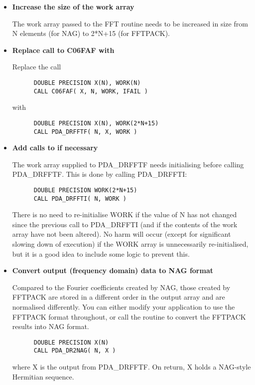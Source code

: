 \begin{itemize}

\item{\bf Increase the size of the work array}

   The work array passed to the FFT routine needs to be increased in
   size from N elements (for NAG) to 2*N+15 (for FFTPACK).

\item{\bf Replace call to C06FAF with
}

   Replace the call

\begin{verbatim}
      DOUBLE PRECISION X(N), WORK(N)
      CALL C06FAF( X, N, WORK, IFAIL )
\end{verbatim}

   with

\begin{verbatim}
      DOUBLE PRECISION X(N), WORK(2*N+15)
      CALL PDA_DRFFTF( N, X, WORK )
\end{verbatim}

\item{\bf\label{faf3}Add calls to
if necessary}

   The work array supplied to PDA\_DRFFTF needs initialising before calling
   PDA\_DRFFTF. This is done by calling PDA\_DRFFTI:

\begin{verbatim}
      DOUBLE PRECISION WORK(2*N+15)
      CALL PDA_DRFFTI( N, WORK )
\end{verbatim}

   There is no need to re-initialise WORK if the value of N has not
   changed since the previous call to PDA\_DRFFTI (and if the contents of the
   work array have not been altered). No harm will occur (except for
   significant slowing down of execution) if the WORK array is
   unnecessarily re-initialised, but it is a good idea to include some
   logic to prevent this.

\item{\bf Convert output (frequency domain) data to NAG format}

   Compared to the Fourier coefficients created by NAG, those created
   by FFTPACK are stored in a different order in the output array and
   are normalised differently. You can either modify your application to
   use the FFTPACK format throughout, or call
   the
   routine to convert the FFTPACK results into NAG format.

\begin{verbatim}
      DOUBLE PRECISION X(N)
      CALL PDA_DR2NAG( N, X )
\end{verbatim}

   where X is the output from PDA\_DRFFTF. On return, X holds a NAG-style
   Hermitian sequence.

\end{itemize}

